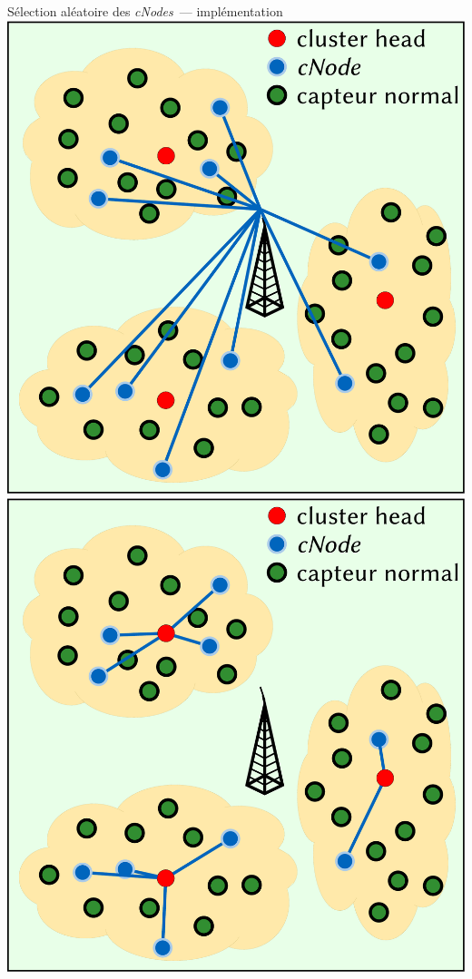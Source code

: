 \documentclass[aspectratio=43]{beamer} %
\newcommand\cns{\textit{cNodes}\xspace}
\begin{document}
\begin{frame}{Sélection aléatoire des \cns\ --- implémentation}
  \includegraphics[height=.4\textheight]{Figs/elec_bs.pdf}\hfill
  \includegraphics[height=.4\textheight]{Figs/elec_ch.pdf}\hfill

\end{frame}
\end{document}
